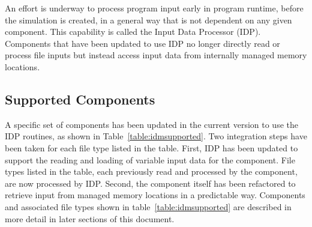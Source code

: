 An effort is underway to process program input early in program runtime, before the simulation is created, in a general way that is not dependent on any given component.  This capability is called the \mf Input Data Processor (IDP).  Components that have been updated to use IDP no longer directly read or process file inputs but instead access input data from internally managed memory locations. 

\subsection{Supported Components}

A specific set of \mf components has been updated in the current version to use the IDP routines, as shown in Table~\ref{table:idmsupported}.  Two integration steps have been taken for each file type listed in the table.  First, IDP has been updated to support the reading and loading of variable input data for the component.  File types listed in the table, each previously read and processed by the component, are now processed by IDP.  Second, the component itself has been refactored to retrieve input from managed memory locations in a predictable way.  Components and associated file types shown in table~\ref{table:idmsupported} are described in more detail in later sections of this document.

